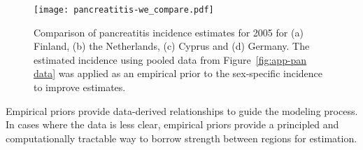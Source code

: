     \begin{figure}[h]
        \begin{center}
            \texttt{[image: pancreatitis-we\_compare.pdf]}
            \caption[Comparison of pancreatitis incidence estimates
              for 2005]{Comparison of pancreatitis incidence estimates
              for 2005 for (a) Finland, (b) the Netherlands, (c)
              Cyprus and (d) Germany.  The estimated incidence using
              pooled data from Figure~\ref{fig:app-pan data} was
              applied as an empirical prior to the sex-specific
              incidence to improve estimates.}
            \label{fig:app-pan compare}
        \end{center}
    \end{figure}
    
Empirical priors provide data-derived relationships to guide the
modeling process.  In cases where the data is less clear, empirical
priors provide a principled and computationally tractable way to
borrow strength between regions for estimation.
